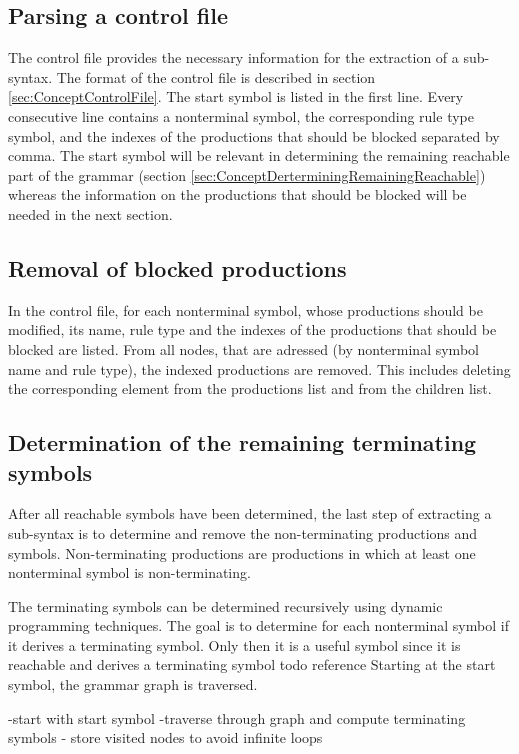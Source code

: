 \subsection{Parsing a control file}\label{sec:ConceptParsingControlFile}
The control file provides the necessary information for the extraction of a sub-syntax.
The format of the control file is described in section \ref{sec:ConceptControlFile}. 
The start symbol is listed in the first line.
Every consecutive line contains a nonterminal symbol, the corresponding rule type symbol, and the indexes of the productions that should be blocked separated by comma.
The start symbol will be relevant in determining the remaining reachable part of the grammar (section \ref{sec:ConceptDerterminingRemainingReachable}) whereas the information on the productions that should be blocked will be needed in the next section.

\subsection{Removal of blocked productions}\label{sec:ConceptRemovingBlockedProductions}
In the control file, for each nonterminal symbol, whose productions should be modified, its name, rule type and the indexes of the productions that should be blocked are listed.
From all nodes, that are adressed (by nonterminal symbol name and rule type), the indexed productions are removed.
This includes deleting the corresponding element from the productions list and from the children list.

\subsection{Determination of the remaining terminating symbols}\label{sec:ConceptDerterminingRemainingTerminating}
After all reachable symbols have been determined, the last step of extracting a sub-syntax is to determine and remove the non-terminating productions and symbols.
Non-terminating productions are productions in which at least one nonterminal symbol is non-terminating.

The terminating symbols can be determined recursively using dynamic programming techniques.
The goal is to determine for each nonterminal symbol if it derives a terminating symbol. Only then it is a useful symbol since it is reachable and derives a terminating symbol todo reference
Starting at the start symbol, the grammar graph is traversed. 

-start with start symbol
-traverse through graph and compute terminating symbols
- store visited nodes to avoid infinite loops

